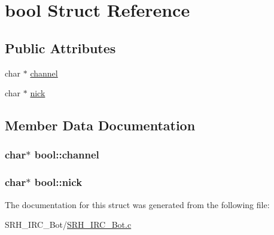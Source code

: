 \hypertarget{structbool}{\section{bool Struct Reference}
\label{structbool}
}
\subsection*{Public Attributes}
\begin{DoxyCompactItemize}
\item 
char $\ast$ \hyperlink{structbool_a31fda1ba6213e07c06bf0d3d66f34c40}{channel}
\item 
char $\ast$ \hyperlink{structbool_a4f11c29c5b18146faf784630e6dd3046}{nick}
\end{DoxyCompactItemize}


\subsection{Member Data Documentation}
\hypertarget{structbool_a31fda1ba6213e07c06bf0d3d66f34c40}{
\subsubsection[{channel}]{\setlength{\rightskip}{0pt plus 5cm}char$\ast$ bool\+::channel}}\label{structbool_a31fda1ba6213e07c06bf0d3d66f34c40}
\hypertarget{structbool_a4f11c29c5b18146faf784630e6dd3046}{
\subsubsection[{nick}]{\setlength{\rightskip}{0pt plus 5cm}char$\ast$ bool\+::nick}}\label{structbool_a4f11c29c5b18146faf784630e6dd3046}


The documentation for this struct was generated from the following file\+:\begin{DoxyCompactItemize}
\item 
S\+R\+H\+\_\+\+I\+R\+C\+\_\+\+Bot/\hyperlink{_s_r_h___i_r_c___bot_8c}{S\+R\+H\+\_\+\+I\+R\+C\+\_\+\+Bot.\+c}\end{DoxyCompactItemize}
